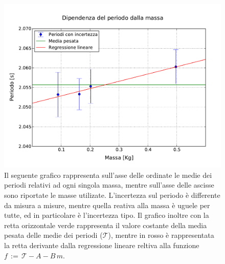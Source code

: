 \begin{figure}
    \centering
    \includegraphics[width=120mm]{immagini/masse.pdf}
    \caption{Il seguente grafico rappresenta sull'asse delle ordinate le medie dei periodi relativi ad ogni singola massa, mentre sull'asse delle ascisse sono riportate le masse utilizate. L'incertezza sul periodo è differente da misura a misure, mentre quella reativa alla massa è uguele per tutte, ed in particolare è l'incertezza tipo. Il grafico inoltre con la retta orizzontale verde rappresenta il valore costante della media pesata delle medie dei periodi ($\mathcal{T}$), mentre in rosso è rappresentata la retta derivante dalla regressione lineare reltiva alla funzione $f \,:=\, \mathcal{T} - A - B\,m$.}
    \label{fig: periodo vs masse}
\end{figure}